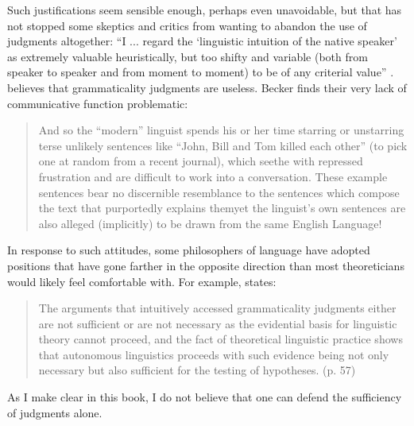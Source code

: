 Such justifications seem sensible enough, perhaps even unavoidable, but that has not stopped some skeptics and critics from wanting to abandon the use of judgments altogether: ``I ... regard the `linguistic intuition of the native speaker' as extremely valuable heuristically, but too shifty and variable (both from speaker to speaker and from moment to moment) to be of any criterial value'' \citep[15]{Householder1965}. \citet{Gethin1990} believes that grammaticality judgments are useless. Becker finds their very lack of communicative function problematic:

\begin{quote}
And so the ``modern'' linguist spends his or her time starring or unstarring terse unlikely sentences like ``John, Bill and Tom killed each other'' (to pick one at random from a recent journal), which seethe with repressed frustration and are difficult to work into a conversation. These example sentences bear no discernible resemblance to the sentences which compose the text that purportedly explains them\schdash{}yet the linguist's own sentences are also alleged (implicitly) to be drawn from the same English Language! \citep[70]{Becker1975}
\end{quote}

In response to such attitudes, some philosophers of language have adopted positions that have gone farther in the opposite direction than most theoreticians would likely feel comfortable with. For example, \citet{Carr1990} states:

\begin{quote}
The arguments that intuitively accessed grammaticality judgments either are not sufficient or are not necessary as the evidential basis for linguistic theory cannot proceed, and the fact of theoretical linguistic practice shows that autonomous linguistics proceeds with such evidence being not only necessary but also sufficient for the testing of hypotheses. (p. 57)

  
 \end{quote}

\noindent
As I make clear in this book, I do not believe that one can defend the sufficiency of judgments  alone.


